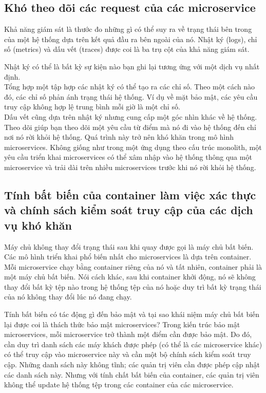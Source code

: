 \documentclass[12pt,a4paper]{report}
\begin{document}
		\subsection{Khó theo dõi các request của các microservice}
				{\hspace{0.6cm}Khả năng giám sát là thước đo những gì có thể suy ra về trạng thái bên trong của một hệ thống dựa trên kết quả đầu ra bên ngoài của nó. Nhật ký (logs), chỉ số (metrics) và dấu vết (traces) được coi là ba trụ cột của khả năng giám sát.\\}
				
				Nhật ký có thể là bất kỳ sự kiện nào bạn ghi lại tương ứng với một dịch vụ nhất định.\\
				
				Tổng hợp một tập hợp các nhật ký có thể tạo ra các chỉ số. Theo một cách nào đó, các chỉ số phản ánh trạng thái hệ thống. Ví dụ về mặt bảo mật, các yêu cầu truy cập không hợp lệ trung bình mỗi giờ là một chỉ số.\\
				
				Dấu vết cũng dựa trên nhật ký nhưng cung cấp một góc nhìn khác về hệ thống. Theo dõi giúp bạn theo dõi một yêu cầu từ điểm mà nó đi vào hệ thống đến chỉ nơi nó rời khỏi hệ thống. Quá trình này trở nên khó khăn trong mô hình microservices. Không giống như trong một ứng dụng theo cấu trúc monolith, một yêu cầu triển khai microservices có thể xâm nhập vào hệ thống thông qua một microservice và trải dài trên nhiều microservices trước khi nó rời khỏi hệ thống.			
		\subsection{Tính bất biến của container làm việc xác thực và chính sách kiểm soát truy cập của các dịch vụ khó khăn}
				{\hspace{0.6cm}Máy chủ không thay đổi trạng thái sau khi quay được gọi là máy chủ bất biến. Các mô hình triển khai phổ biến nhất cho microservices là dựa trên container. Mỗi microservice chạy bằng container riêng của nó và tất nhiên, container phải là một máy chủ bất biến. Nói cách khác, sau khi container khởi động, nó sẽ không thay đổi bất kỳ tệp nào trong hệ thống tệp của nó hoặc duy trì bất kỳ trạng thái của nó không thay đổi lúc nó đang chạy.\\}
				
				Tính bất biến có tác động gì đến bảo mật và tại sao khái niệm máy chủ bất biến lại được coi là thách thức bảo mật microservices? Trong kiến trúc bảo mật microservices, mỗi microservice trở thành một điểm cần được bảo mật. Do đó, cần duy trì danh sách các máy khách được phép (có thể là các microservice khác) có thể truy cập vào microservice này và cần một bộ chính sách kiểm soát truy cập. Những danh sách này không tĩnh; các quản trị viên cần được phép cập nhật các danh sách này. Nhưng với tính chất bất biến của container, các quản trị viên không thể update hệ thống tệp trong các container của các microservice.
\end{document}
